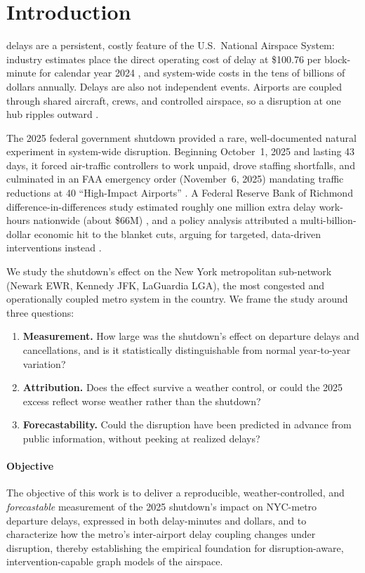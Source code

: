 \documentclass[10pt,journal]{IEEEtran}
\begin{document}
\section{Introduction}
\label{sec:intro}
 delays are a persistent, costly feature of the U.S.\
National Airspace System: industry estimates place the direct operating cost of
delay at \$100.76 per block-minute for calendar year 2024 \cite{a4a2025}, and
system-wide costs in the tens of billions of dollars annually. Delays are also
not independent events. Airports are coupled through shared aircraft, crews,
and controlled airspace, so a disruption at one hub ripples outward
\cite{fleurquin2013}.

The 2025 federal government shutdown provided a rare, well-documented natural
experiment in system-wide disruption. Beginning October~1, 2025 and lasting 43
days, it forced air-traffic controllers to work unpaid, drove staffing
shortfalls, and culminated in an FAA emergency order (November~6, 2025)
mandating traffic reductions at 40 ``High-Impact Airports'' \cite{faa2025order}.
A Federal Reserve Bank of Richmond difference-in-differences study estimated
roughly one million extra delay work-hours nationwide (about \$66M)
\cite{richmondfed2025}, and a policy analysis attributed a multi-billion-dollar
economic hit to the blanket cuts, arguing for targeted, data-driven
interventions instead \cite{ctp2026}.

We study the shutdown's effect on the New York metropolitan sub-network
(Newark EWR, Kennedy JFK, LaGuardia LGA), the most congested and operationally
coupled metro system in the country. We frame the study around three questions:

\begin{enumerate}
  \item \textbf{Measurement.} How large was the shutdown's effect on
        departure delays and cancellations, and is it statistically
        distinguishable from normal year-to-year variation?
  \item \textbf{Attribution.} Does the effect survive a weather control, or
        could the 2025 excess reflect worse weather rather than the shutdown?
  \item \textbf{Forecastability.} Could the disruption have been predicted in
        advance from public information, without peeking at realized delays?
\end{enumerate}

\paragraph{Objective}
The objective of this work is to deliver a reproducible, weather-controlled,
and \emph{forecastable} measurement of the 2025 shutdown's impact on NYC-metro
departure delays, expressed in both delay-minutes and dollars, and to
characterize how the metro's inter-airport delay coupling changes under
disruption, thereby establishing the empirical foundation for
disruption-aware, intervention-capable graph models of the airspace.
\end{document}
